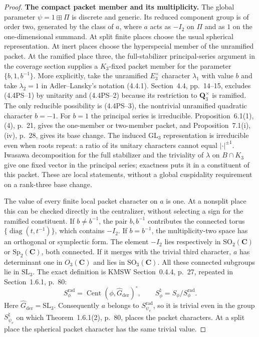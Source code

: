 \documentclass[11pt,a4paper]{article}
\theoremstyle{definition}
\renewcommand{\paragraph}[1]{\par\smallskip\noindent\textbf{#1}\quad\ignorespaces}
\begin{document}
\begin{proof}
\paragraph{The compact packet member and its multiplicity.}
The global parameter $\psi=1\boxplus\Pi$ is discrete and generic.
Its reduced component group is of order two, generated by the
class of $a$, where $a$ acts as $-I_2$ on $\Pi$ and as $1$ on
the one-dimensional summand. At split finite places choose the
usual spherical representation. At inert places choose the
hyperspecial member of the unramified packet. At the ramified
place three, the full-stabilizer principal-series argument in
the coverage section supplies a $K_3$-fixed packet member for
the parameter $\{b,1,b^{-1}\}$. More explicitly, take the
unramified $E_3^\times$ character $\lambda_1$ with value $b$
and take $\lambda_2=1$ in Adler--Lansky's notation (4.4.1).
Section~4.4, pp.~14--15, excludes (4.4PS--1) by unitarity
and (4.4PS--2) because its restriction to $\mathbf Q_3^\times$
is ramified. The only reducible possibility is (4.4PS--3),
the nontrivial unramified quadratic character $b=-1$.
For $b=1$ the principal series is irreducible.
Proposition~6.1(1),(4), p.~21, gives the one-member or
two-member packet, and Proposition~7.1(i),(iv), p.~28,
gives its base change. The induced $\mathrm{GL}_3$ representation
is irreducible even when roots repeat: a ratio of its unitary
characters cannot equal $|\cdot|^{\pm1}$.
Iwasawa decomposition for the full stabilizer and the triviality
of $\lambda$ on $B\cap K_3$ give one fixed vector in the
principal series; exactness puts it in a constituent of this
packet. These are local statements, without a global
cuspidality requirement on a rank-three base change.

The value of every finite local packet character on $a$ is one.
At a nonsplit place this can be checked directly in the
centralizer, without selecting a sign for the ramified
constituent. If $b\ne b^{-1}$, the pair $b,b^{-1}$ contributes
the connected torus $\{\operatorname{diag}(t,t^{-1})\}$,
which contains $-I_2$. If $b=b^{-1}$, the multiplicity-two
space has an orthogonal or symplectic form. The element
$-I_2$ lies respectively in $\mathrm{SO}_2(\mathbf C)$ or
$\mathrm{Sp}_2(\mathbf C)$, both connected. If it merges with
the trivial third character, $a$ has determinant one in
$O_3(\mathbf C)$ and lies in $\mathrm{SO}_3(\mathbf C)$.
All these connected subgroups lie in $\mathrm{SL}_3$.
The exact definition is KMSW Section~0.4.4, p.~27,
repeated in Section~1.6.1, p.~80:
\[
 S_\phi^{\mathrm{rad}}=
       \operatorname{Cent}(\phi,\widehat G_{\mathrm{der}})^\circ,
 \qquad S_\phi^{\natural}=S_\phi/S_\phi^{\mathrm{rad}}.
\]
Here $\widehat G_{\mathrm{der}}=\mathrm{SL}_3$.
Consequently $a$ belongs to $S_{\psi_v}^{\mathrm{rad}}$, so
it is trivial even in the group $S_{\psi_v}^{\natural}$ on
which Theorem~1.6.1(2), p.~80, places the packet characters.
At a split place the
spherical packet character has the same trivial value.


\end{proof}
\end{document}
